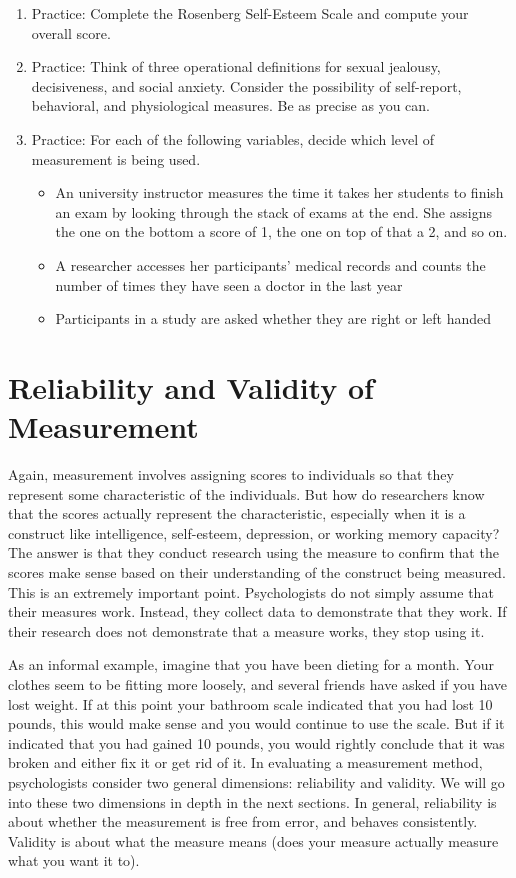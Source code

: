 \documentclass[]{book}
\theoremstyle{definition}
\theoremstyle{definition}
\theoremstyle{remark}
\begin{document}
\begin{enumerate}
\def\labelenumi{\arabic{enumi}.}
\item
  Practice: Complete the Rosenberg Self-Esteem Scale and compute your
  overall score.
\item
  Practice: Think of three operational definitions for sexual jealousy,
  decisiveness, and social anxiety. Consider the possibility of
  self-report, behavioral, and physiological measures. Be as precise as
  you can.
\item
  Practice: For each of the following variables, decide which level of
  measurement is being used.

  \begin{itemize}
  \item
    An university instructor measures the time it takes her students to
    finish an exam by looking through the stack of exams at the end. She
    assigns the one on the bottom a score of 1, the one on top of that a
    2, and so on.
  \item
    A researcher accesses her participants' medical records and counts
    the number of times they have seen a doctor in the last year
  \item
    Participants in a study are asked whether they are right or left
    handed
  \end{itemize}
\end{enumerate}

\chapter{Reliability and Validity of
Measurement}\label{reliability-and-validity-of-measurement}

Again, measurement involves assigning scores to individuals so that they
represent some characteristic of the individuals. But how do researchers
know that the scores actually represent the characteristic, especially
when it is a construct like intelligence, self-esteem, depression, or
working memory capacity? The answer is that they conduct research using
the measure to confirm that the scores make sense based on their
understanding of the construct being measured. This is an extremely
important point. Psychologists do not simply assume that their measures
work. Instead, they collect data to demonstrate that they work. If their
research does not demonstrate that a measure works, they stop using it.

As an informal example, imagine that you have been dieting for a month.
Your clothes seem to be fitting more loosely, and several friends have
asked if you have lost weight. If at this point your bathroom scale
indicated that you had lost 10 pounds, this would make sense and you
would continue to use the scale. But if it indicated that you had gained
10 pounds, you would rightly conclude that it was broken and either fix
it or get rid of it. In evaluating a measurement method, psychologists
consider two general dimensions: reliability and validity. We will go
into these two dimensions in depth in the next sections. In general,
reliability is about whether the measurement is free from error, and
behaves consistently. Validity is about what the measure means (does
your measure actually measure what you want it to).
\end{document}
